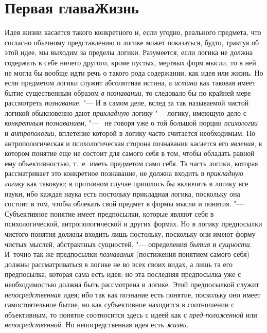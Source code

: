 {{\chapter[Первая глава Жизнь]{Первая глава\newline Жизнь}
Идея жизни касается такого конкретного и, если угодно,
реального предмета, что согласно обычному представлению о логике может
показаться, будто, трактуя об этой идее, мы выходим за пределы логики.
Разумеется, если логика не должна содержать в себе ничего другого, кроме
пустых, мертвых форм мысли, то в ней не могла бы вообще идти речь о такого
рода содержании, как идея или жизнь. Но если предметом логики служит
абсолютная истина, а {\em истина}
как таковая имеет бытие существенным образом
{\em в познавании}, то
следовало бы по крайней мере рассмотреть
{\em познавание}. "--- И в
самом деле, вслед за так называемой чистой логикой обыкновенно дают
{\em прикладную} логику
"--- логику, имеющую дело с
{\em конкретным познаванием}, "---
\ не говоря уже о той большой порции
{\em психологии} и
{\em антропологии},
вплетение которой в логику часто считается необходимым. Но
антропологическая и психологическая сторона познавания касается его
{\em явления}, в котором
понятие еще не состоит для самого себя в том, чтобы обладать равной ему
объективностью, т.~е. иметь предметом само себя. Та часть логики, которая
рассматривает это конкретное познавание, не должна входить в
{\em прикладную логику}
как таковую; в противном случае пришлось бы включить в логику
все науки, ибо каждая наука есть постольку прикладная логика, поскольку она
состоит в том, чтобы облекать свой предмет в формы мысли и понятия. "---
Субъективное понятие имеет предпосылки, которые являют себя в
психологической, антропологической и других формах. Но в логику предпосылки
чистого понятия должны входить лишь постольку, поскольку они имеют форму
чистых мыслей, абстрактных сущностей, "--- определения
{\em бытия} и {\em сущности}. И~точно
так же предпосылки {\em познавания}
(постижения понятием самого себя) должны
рассматриваться в логике не во всех своих видах, а лишь та
его предпосылка, которая сама есть идея; но эта последняя предпосылка уже с
необходимостью должна быть рассмотрена в логике. Этой предпосылкой служит
{\em непосредственная}
идея; ибо так как познание есть понятие, поскольку оно имеет
самостоятельное бытие, но как субъективное находится в соотношении с
объективным, то понятие соотносится здесь с идеей как с
{\em пред-положенной} или
{\em непосредственной}.
Но непосредственная идея есть
{\em жизнь}.

}}
